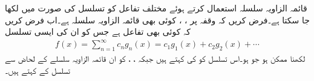 قائمہ الزاویہ سلسلہ استعمال کرتے ہوئے مختلف تفاعل کو تسلسل کی صورت میں لکھا جا سکتا ہے۔فرض کریں کہ وقفہ  پر ، ،  کوئی بھی قائمہ الزاویہ سلسلہ ہے۔اب فرض کریں کہ  کوئی بھی تفاعل ہے جس کو ان  کی ایسی تسلسل
\begin{align}\label{مساوات_طاقتی_اضافی_فوریئر_عمومی_الف}
f(x)=\sum_{n=1}^{\infty} c_n g_n(x)=c_1g_1(x)+c_2g_2(x)+\cdots
\end{align}
لکھنا ممکن ہو جو  ہو۔اس تسلسل کو  کی  کہتے ہیں جبکہ ، ،  کو ان قائمہ الزاویہ سلسلے کے لحاض سے تسلسل کے  کہتے ہیں۔ 

